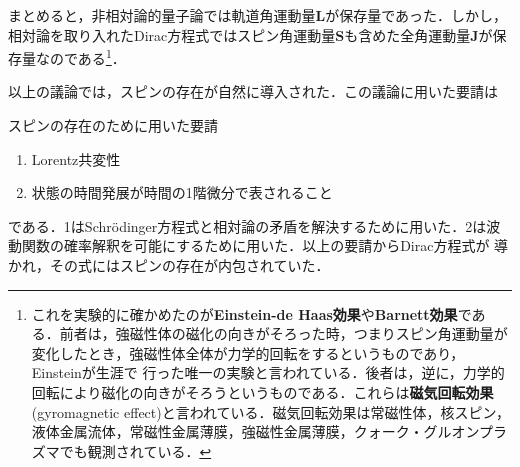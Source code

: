 \documentclass{report}
\begin{document}
  まとめると，非相対論的量子論では軌道角運動量$\bm{L}$が保存量であった．しかし，相対論を取り入れたDirac方程式ではスピン角運動量$\bm{S}$も含めた全角運動量$\bm{J}$が保存量なのである\footnote{
    これを実験的に確かめたのが\textbf{Einstein-de Haas効果}や\textbf{Barnett効果}である．前者は，強磁性体の磁化の向きがそろった時，つまりスピン角運動量が変化したとき，強磁性体全体が力学的回転をするというものであり，Einsteinが生涯で
    行った唯一の実験と言われている．後者は，逆に，力学的回転により磁化の向きがそろうというものである．これらは\textbf{磁気回転効果}(gyromagnetic effect)と言われている．磁気回転効果は常磁性体，核スピン，液体金属流体，常磁性金属薄膜，強磁性金属薄膜，クォーク・グルオンプラズマでも観測されている．
  }．

  以上の議論では，スピンの存在が自然に導入された．この議論に用いた要請は
  \begin{itembox}[l]{スピンの存在のために用いた要請}
  \begin{enumerate}
    \item Lorentz共変性
    \item 状態の時間発展が時間の1階微分で表されること
  \end{enumerate}
  \end{itembox}
  である．1はSchrödinger方程式と相対論の矛盾を解決するために用いた．2は波動関数の確率解釈を可能にするために用いた．以上の要請からDirac方程式が
  導かれ，その式にはスピンの存在が内包されていた．
\end{document}
